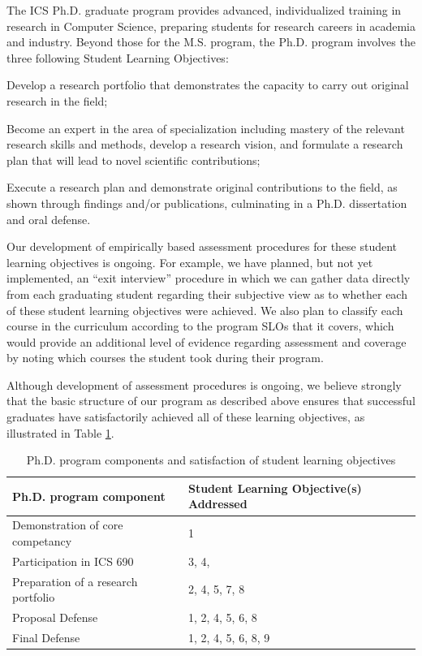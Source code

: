 \documentclass[12pt]{article}
\begin{document}
The ICS Ph.D. graduate program provides advanced, individualized training in research 
in Computer Science, preparing students for research careers in academia and industry.  
Beyond  those for the M.S. program, the Ph.D. program involves the three following 
Student Learning Objectives:

\begin{list}{.}{ \setcounter{listcounter}{6}}
\item Develop a research portfolio that demonstrates the capacity to carry out original 
research in the field;
\item Become an expert in the area of specialization including mastery of the relevant 
research skills and methods, develop a research vision, and formulate a research plan 
that will lead to novel scientiﬁc contributions;
\item Execute a research plan and demonstrate original contributions to the field, as 
shown through ﬁndings and/or publications, culminating in a Ph.D. dissertation and oral 
defense.
\end{list}

Our development of empirically based assessment procedures for these student learning
objectives is ongoing.  For example, we have planned, but not yet
implemented, an ``exit interview'' procedure in which we can gather data
directly from each graduating student regarding their subjective view as to
whether each of these student learning objectives were achieved. We also
plan to classify each course in the curriculum according to the program
SLOs that it covers, which would provide an additional level of evidence
regarding assessment and coverage by noting which courses the student took
during their program. 

Although development of assessment procedures is ongoing, we believe
strongly that the basic structure of our program as described above ensures
that successful graduates have satisfactorily achieved all of these
learning objectives, as illustrated in Table \ref{phd.slos}.

\begin{table}[htbp]
\begin{center}
\caption{Ph.D. program components and satisfaction of student learning
  objectives}
\label{phd.slos}
\begin{tabular}{|l|l|} \hline
{\bf Ph.D. program component} & {\bf Student Learning Objective(s) Addressed}  \\ \hline
Demonstration of core competancy & 1 \\
Participation in ICS 690 & 3, 4,  \\
Preparation of a research portfolio & 2, 4, 5, 7, 8 \\
Proposal Defense & 1, 2, 4, 5, 6, 8 \\
Final Defense & 1, 2, 4, 5, 6, 8, 9 \\ \hline
\end{tabular}
\end{center}
\end{table}
\end{document}
